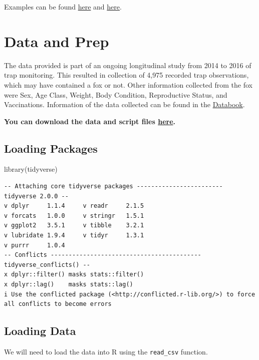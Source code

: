 \documentclass[
  letterpaper,
]{report}
\newenvironment{Shaded}{\begin{snugshade}}{\end{snugshade}}
\newcommand{\FunctionTok}[1]{\textcolor[rgb]{0.28,0.35,0.67}{#1}}
\newcommand{\NormalTok}[1]{\textcolor[rgb]{0.00,0.23,0.31}{#1}}
\begin{document}
Examples can be found \href{}{here} and
\href{https://docs.google.com/presentation/d/1HefRJoGvXEPM7EuhP6JONAQtaxWXlJ629W5KTrP2r68/edit?usp=sharing}{here}.

\section{Data and Prep}\label{data-and-prep}

The data provided is part of an ongoing longitudinal study from 2014 to
2016 of trap monitoring. This resulted in collection of 4,975 recorded
trap observations, which may have contained a fox or not. Other
information collected from the fox were Sex, Age Class, Weight, Body
Condition, Reproductive Status, and Vaccinations. Information of the
data collected can be found in the
\href{https://www.inqs.info/ci_datathon_25/codebook_19052696}{Databook}.

\textbf{You can download the data and script files \href{}{here}.}

\subsection{Loading Packages}\label{loading-packages}

\begin{Shaded}
\begin{Highlighting}[]
\FunctionTok{library}\NormalTok{(tidyverse)}
\end{Highlighting}
\end{Shaded}

\begin{verbatim}
-- Attaching core tidyverse packages ------------------------ tidyverse 2.0.0 --
v dplyr     1.1.4     v readr     2.1.5
v forcats   1.0.0     v stringr   1.5.1
v ggplot2   3.5.1     v tibble    3.2.1
v lubridate 1.9.4     v tidyr     1.3.1
v purrr     1.0.4     
-- Conflicts ------------------------------------------ tidyverse_conflicts() --
x dplyr::filter() masks stats::filter()
x dplyr::lag()    masks stats::lag()
i Use the conflicted package (<http://conflicted.r-lib.org/>) to force all conflicts to become errors
\end{verbatim}

\subsection{Loading Data}\label{loading-data}

We will need to load the data into R using the \texttt{read\_csv}
function.
\end{document}
